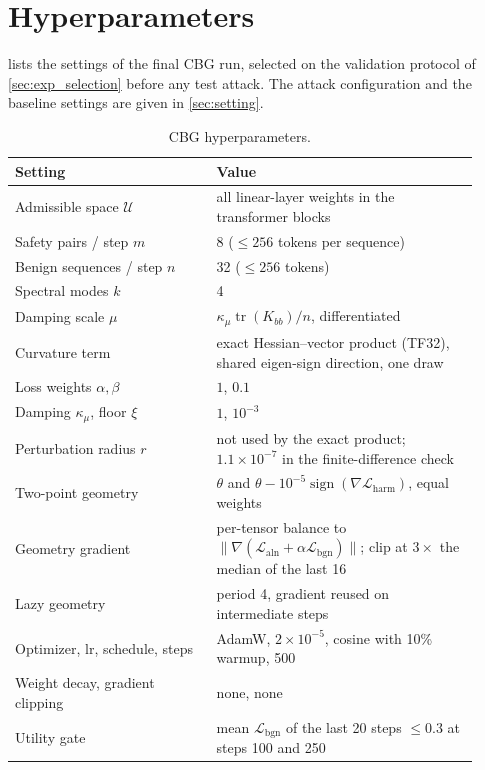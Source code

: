 \documentclass[11pt]{article}
\newcommand{\U}{\mathcal{U}}
\newcommand{\Laln}{\mathcal{L}_{\mathrm{aln}}}
\newcommand{\Lbgn}{\mathcal{L}_{\mathrm{bgn}}}
\newcommand{\tr}{\operatorname{tr}}
\begin{document}
\section{Hyperparameters}
\label{app:hparams}

 lists the settings of the final CBG run, selected on the validation protocol of \cref{sec:exp_selection} before any test attack. The attack configuration and the baseline settings are given in \cref{sec:setting}.

\begin{table}[h]
\centering
\small
\caption{CBG hyperparameters.}
\label{tab:hparams}
\begin{tabular}{@{}p{0.40\linewidth}p{0.52\linewidth}@{}}
\toprule
Setting & Value\\
\midrule
Admissible space $\U$ & all linear-layer weights in the transformer blocks\\
Safety pairs / step $m$ & 8 ($\le256$ tokens per sequence)\\
Benign sequences / step $n$ & 32 ($\le256$ tokens)\\
Spectral modes $k$ & 4\\
Damping scale $\mu$ & $\kappa_\mu\tr(K_{bb})/n$, differentiated\\
Curvature term & exact Hessian--vector product (TF32), shared eigen-sign direction, one draw\\
Loss weights $\alpha,\beta$ & $1$, $0.1$\\
Damping $\kappa_\mu$, floor $\xi$ & $1$, $10^{-3}$\\
Perturbation radius $r$ & not used by the exact product; $1.1\times10^{-7}$ in the finite-difference check\\
Two-point geometry & $\theta$ and $\theta-10^{-5}\operatorname{sign}(\nabla\mathcal L_{\mathrm{harm}})$, equal weights\\
Geometry gradient & per-tensor balance to $\|\nabla(\Laln+\alpha\Lbgn)\|$; clip at $3\times$ the median of the last 16\\
Lazy geometry & period 4, gradient reused on intermediate steps\\
Optimizer, lr, schedule, steps & AdamW, $2\times10^{-5}$, cosine with 10\% warmup, 500\\
Weight decay, gradient clipping & none, none\\
Utility gate & mean $\Lbgn$ of the last 20 steps $\le0.3$ at steps 100 and 250\\
\bottomrule
\end{tabular}
\end{table}
\end{document}
